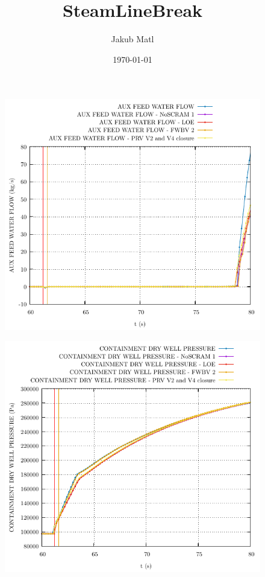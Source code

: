 \documentclass{article}
\title{SteamLineBreak}
\author{Jakub Matl}
\date{\today}
\begin{document}
\maketitle
\begin{multicols}{2}
\begin{figure}[H]
\centering
\includegraphics[width=\linewidth]{./graphs/AUX FEED WATER FLOW.pdf}
\end{figure}
\begin{figure}[H]
\centering
\includegraphics[width=\linewidth]{./graphs/CONTAINMENT DRY WELL PRESSURE.pdf}

\end{figure}
\end{multicols}
\end{document}
